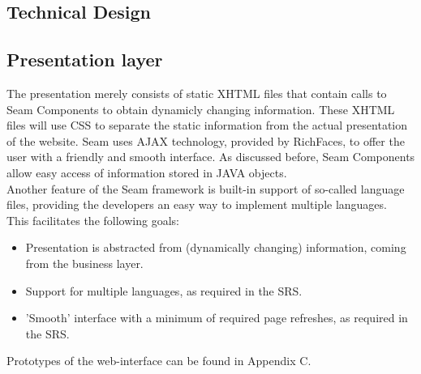 \documentclass[salesmen, twoside]{../../../templates/latex/2009/softproj}
\begin{document}
\begin{projdoc}
\chapter{Technical Design \label{Technical Design}}
\section{Presentation layer}
The presentation merely consists of static XHTML files that contain calls to Seam Components to obtain dynamicly changing information. These XHTML files will use CSS to separate the static information from the actual presentation of the website. Seam uses AJAX technology, provided by RichFaces, to offer the user with a friendly and smooth interface. As discussed before, Seam Components allow easy access of information stored in JAVA objects.\\
Another feature of the Seam framework is built-in support of so-called language files, providing the developers an easy way to implement multiple languages.\\

This facilitates the following goals:
\begin{itemize}
\item Presentation is abstracted from (dynamically changing) information, coming from the business layer.
\item Support for multiple languages, as required in the SRS.
\item 'Smooth' interface with a minimum of required page refreshes, as required in the SRS.
\end{itemize}
Prototypes of the web-interface can be found in Appendix C.


\end{projdoc}
\end{document}

